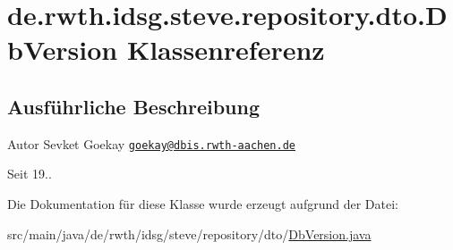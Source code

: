 \hypertarget{classde_1_1rwth_1_1idsg_1_1steve_1_1repository_1_1dto_1_1_db_version}{\section{de.\+rwth.\+idsg.\+steve.\+repository.\+dto.\+Db\+Version Klassenreferenz}
\label{classde_1_1rwth_1_1idsg_1_1steve_1_1repository_1_1dto_1_1_db_version}
}


\subsection{Ausführliche Beschreibung}
\begin{DoxyAuthor}{Autor}
Sevket Goekay \href{mailto:goekay@dbis.rwth-aachen.de}{\tt goekay@dbis.\+rwth-\/aachen.\+de} 
\end{DoxyAuthor}
\begin{DoxySince}{Seit}
19.. 
\end{DoxySince}


Die Dokumentation für diese Klasse wurde erzeugt aufgrund der Datei\+:\begin{DoxyCompactItemize}
\item 
src/main/java/de/rwth/idsg/steve/repository/dto/\hyperlink{_db_version_8java}{Db\+Version.\+java}\end{DoxyCompactItemize}
